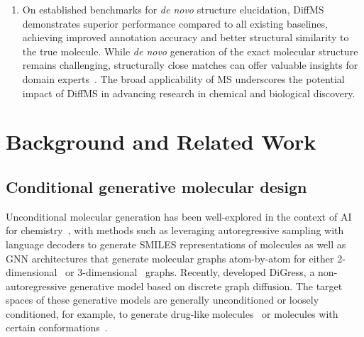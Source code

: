 \documentclass{article}
\theoremstyle{plain}
\theoremstyle{definition}
\theoremstyle{remark}
\newcommand{\ours}{DiffMS\xspace}
\begin{document}
\begin{enumerate}
    \item On established benchmarks for \emph{de novo} structure elucidation, \ours demonstrates superior performance compared to all existing baselines, achieving improved annotation accuracy and better structural similarity to the true molecule. While \emph{de novo} generation of the exact molecular structure remains challenging, structurally close matches can offer valuable insights for domain experts~\citep{butler2023ms2mol}. The broad applicability of MS underscores the potential impact of \ours in advancing research in chemical and biological discovery. %
    
    

\end{enumerate}

\section{Background and Related Work}

\subsection{Conditional generative molecular design}

Unconditional molecular generation has been well-explored in the context of AI for chemistry~\citep{zhang2023artificial}, with methods such as \citet{gomez2018automatic,segler2018generating} leveraging autoregressive sampling with language decoders to generate SMILES representations of molecules as well as GNN architectures that generate molecular graphs atom-by-atom for either 2-dimensional~\citep{liu2018constrained,li2018learning,simonovsky2018graphvae} or 3-dimensional~\citep{flam2022scalable,adams2022equivariant,luo2022autoregressive,liu2022generating3dmoleculestarget} graphs. Recently, \citet{vignac2023digress} developed DiGress, a non-autoregressive generative model based on discrete graph diffusion. The target spaces of these generative models are generally unconditioned or loosely conditioned, for example, to generate drug-like molecules~\citep{luo20213d} or molecules with certain conformations~\citep{roney2022generating}.
\end{document}
